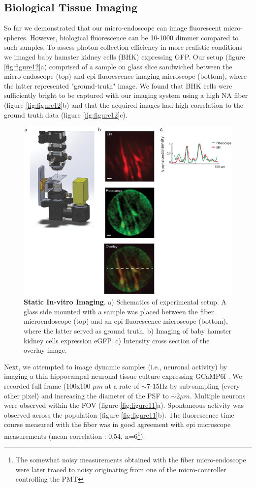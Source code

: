 \documentclass[10pt]{article}
\begin{document}
\subsection{Biological Tissue Imaging}\label{biological_imaging}
So far we demonstrated that our micro-endoscope can image fluorescent micro-spheres. However, biological fluorescence can be 10-1000 dimmer compared to such samples. To assess photon collection efficiency in more realistic conditions we imaged baby hamster kidney cells (BHK) expressing GFP. Our setup (figure \ref{fig:figure12}a) comprised of a sample on glass slice sandwiched between the micro-endoscope (top) and epi-fluorescence imaging microscope (bottom), where the latter represented "ground-truth" image. We found that BHK cells were sufficiently bright to be captured with our imaging system using a high NA fiber (figure \ref{fig:figure12}b) and that the acquired images had high correlation to the ground truth data (figure \ref{fig:figure12}c).


\begin{figure}
\centering\includegraphics[width=12cm]{figure10}
\caption{\textbf{Static In-vitro Imaging}. a) Schematics of experimental setup. A glass side mounted with a sample was placed between the fiber microendoscope (top) and an epi-fluorescence microscope (bottom), where the latter served as ground truth. b) Imaging of baby hamster kidney cells expression eGFP. c) Intensity cross section of the overlay image. }
\label{fig:figure10}
\end{figure}

Next, we attempted to image dynamic samples (i.e., neuronal activity) by imaging a thin hippocampal neuronal tissue culture
expressing GCaMP6f \cite{Chen2013-qr}. We recorded full frame (100x100 $\mu m$ at a rate of $\sim$7-15Hz by sub-sampling (every other pixel) and increasing the diameter of the PSF to $\sim$2$\mu m$. Multiple neurons were observed within the FOV (figure \ref{fig:figure11}a). Spontaneous activity was observed across the population (figure  \ref{fig:figure11}b). The fluorescence time course measured with
the fiber was in good agreement with epi microscope
measurements (mean correlation : 0.54, n=6\footnote{The somewhat noisy measurements obtained with the fiber micro-endoscope were later traced to noisy originating from one of the micro-controller controlling the PMT }). 
\end{document}

